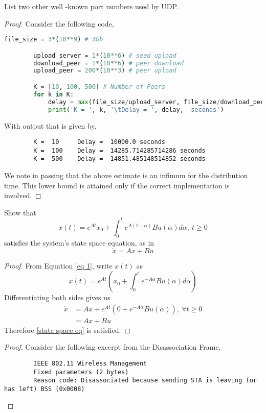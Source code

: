 \documentclass[../../main.tex]{subfiles}
\begin{document}
\begin{wts}
List two other well -known port numbers used by UDP.
\end{wts}
\begin{proof}
Consider the following code,\\
    \begin{lstlisting}[language=Python]
        file_size = 3*(10**9) # 3Gb

        upload_server = 1*(10**6) # seed upload
        download_peer = 1*(10**6) # peer download
        upload_peer = 200*(10**3) # peer upload

        K = [10, 100, 500] # Number of Peers
        for k in K:
            delay = max(file_size/upload_server, file_size/download_peer, (k*file_size)/(upload_server + k*upload_peer))
            print('K = ', k, '\tDelay = ', delay, 'seconds')\end{lstlisting}
        With output that is given by,
        \begin{lstlisting}
        K =  10 	Delay =  10000.0 seconds
        K =  100 	Delay =  14285.714285714286 seconds
        K =  500 	Delay =  14851.485148514852 seconds\end{lstlisting}
        We note in passing that the above estimate is an infimum for the distribution time. This lower bound is attained only if the correct implementation is involved.

\end{proof}

\begin{wts}
    Show that 
    \begin{equation}\label{eq 1}
        x(t) = e^{At}x_0 + \int_0^t e^{A(t-\alpha)}Bu(\alpha)d\alpha,\: t\geq 0
    \end{equation}
    satisfies the system's state space equation, as in
    \begin{equation}\label{state space eq}
        \dot{x} = Ax + Bu
    \end{equation}
\end{wts}
\begin{proof}
    From Equation \eqref{eq 1}, write $x(t)$ as
    \[
    x(t) = e^{At}\left( x_0 + \int_0^t e^{-A\alpha}Bu(\alpha)d\alpha\right)
    \]
    Differentiating both sides gives us
    \begin{align*}
        \dot{x} &= Ax + e^{At}\left(0 + e^{-A\alpha}Bu(\alpha)\right),\:\forall t\geq 0\\
        &= Ax + Bu
    \end{align*}
    Therefore \eqref{state space eq} is satisfied.
\end{proof}
\begin{proof}
    Consider the following excerpt from the Disassociation Frame,\\
    \begin{lstlisting}
        IEEE 802.11 Wireless Management
        Fixed parameters (2 bytes)
        Reason code: Disassociated because sending STA is leaving (or has left) BSS (0x0008)\end{lstlisting}
\end{proof}
\end{document}
